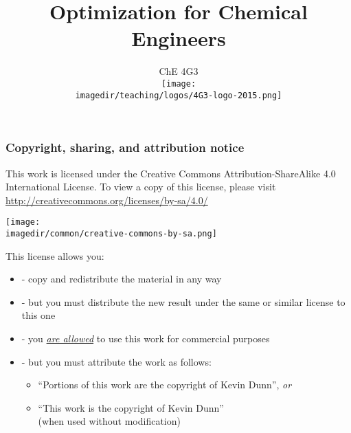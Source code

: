 \documentclass[11pt]{beamer}
\title[]{\Large Optimization for Chemical Engineers}
\subtitle[]{\Large ChE 4G3 \\ \vspace{0.5cm} \texttt{[image: \\imagedir/teaching/logos/4G3-logo-2015.png]} \vspace{-1.5cm} }
\author[]{}
\institute[]{}
\date[]{\copyright~ Kevin Dunn, \today \\ \vspace{1cm}{\footnotesize {\tt kevin.dunn@mcmaster.ca}\\ \href{http://learnche.mcmaster.ca/4G3}{http://learnche.mcmaster.ca/4G3}\\ \vspace{1cm}}

{\footnotesize Revision: \hgversion (\monthname~\THEYEAR)} %
}
\begin{document}
	
\begin{frame} \titlepage \end{frame}

\begin{frame}\frametitle{Copyright, sharing, and attribution notice}

	{\footnotesize This work is licensed under the Creative Commons Attribution-ShareAlike 4.0 International License. To view a copy of this license, 
	please visit \href{http://creativecommons.org/licenses/by-sa/4.0/}{http://creativecommons.org/licenses/by-sa/4.0/}}
	\vspace{-1.0cm}
	\begin{flushright}
		\texttt{[image: \\imagedir/common/creative-commons-by-sa.png]}
		
	\end{flushright}	
	\vspace{-0.2cm}
	\begin{exampleblock}{}
		{\small This license allows you: }
		\begin{itemize}
			\item	{} - copy and redistribute the material in any way
			\item	{} - but you must distribute the new result under the same or similar license to this one
			\item	{} - you \underline{\emph{are allowed}} to use this work for commercial purposes 
			\item	{} - but you must attribute the work as follows:
			\begin{itemize}
				\item	``Portions of this work are the copyright of Kevin Dunn'', \emph{or}
				\item	``This work is the copyright of Kevin Dunn'' \\{\tiny (when used without modification)}
			\end{itemize} 
		\end{itemize}
	\end{exampleblock}
\end{frame}
\end{document}
